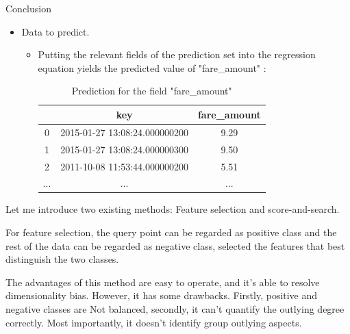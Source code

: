 \documentclass[
 size=14pt,
 paper=smartboard,  %
 mode=present, 		%
 display=slides, 	%
 style=tuliplab,  	%
 pauseslide,
 fleqn,leqno]{powerdot}
\begin{document}
\begin{slide}{Conclusion}
  \begin{itemize}
  \item
  Data to predict.
  
  \begin{itemize}
    \item
    Putting the relevant fields of the prediction set into the regression equation yields the predicted value of "fare_amount" :

    \begin{table}  \centering
      \caption{Prediction for the field "fare\_amount"}
      \label{table:a}
      \begin{tabular}{ccc}
    \toprule
        & key & fare\_amount \\
    \midrule
        0 & 2015-01-27 13:08:24.000000200 & 9.29 \\
        1 & 2015-01-27 13:08:24.000000300 & 9.50 \\
        2 & 2011-10-08 11:53:44.000000200 & 5.51 \\
        ... & ... &... \\
    \bottomrule
    \end{tabular}
    \end{table}
  
  \end{itemize}
  
  \end{itemize}
  
  
  
  \begin{note}
  Let me introduce two existing methods:
  Feature selection and score-and-search.
  
  For feature selection,
  the query point can be regarded as positive class and
  the rest of the data can be regarded as negative class,
  selected the features that best distinguish the two classes.
  
  The advantages of this method are easy to operate,
  and it's able to resolve dimensionality bias.
  However, it has some drawbacks.
  Firstly,
  positive and negative classes are Not balanced,
  secondly,
  it can't quantify the outlying degree correctly.
  Most importantly,
  it doesn't identify group outlying aspects.
  \end{note}
  
  \end{slide}
  
\end{document}
